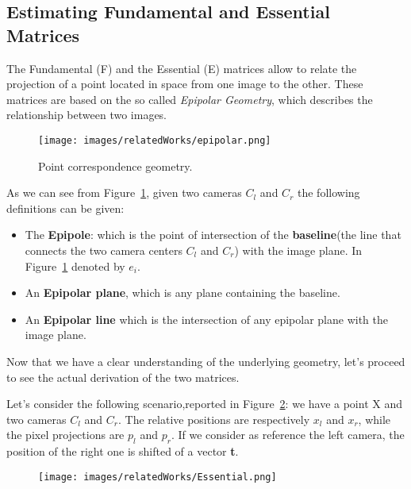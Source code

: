  \subsection{Estimating Fundamental and Essential Matrices}
The Fundamental (F) and the Essential (E) matrices allow to relate the projection of a point located in space from one image to the other.
These matrices are based on the so called \textit{Epipolar Geometry}, which describes the relationship between two images.
\begin{figure}
    \centering
    \texttt{[image: images/relatedWorks/epipolar.png]} %
    \caption{Point correspondence geometry. }
    \label{fig:epipolar}
\end{figure}
As we can see from Figure~\ref{fig:epipolar}, given two cameras $C_l$ and $C_r$ the following definitions can be given:
\begin{itemize}
    \item The \textbf{Epipole}: which is the point of intersection of the \textbf{baseline}(the line that connects the two camera centers
    $C_l$ and $C_r$) with the image plane. In Figure~\ref{fig:epipolar} denoted by $e_i$.
    \item An \textbf{Epipolar plane}, which is any plane containing the baseline.
    \item An \textbf{Epipolar line} which is the intersection of any epipolar plane with the image plane.

\end{itemize}
Now that we have a clear understanding of the underlying geometry, let's proceed to see the actual derivation of the
two matrices.

Let's consider the following scenario,reported in Figure~\ref{fig:EstimateMatrices}: we have a point X and two cameras $C_l$ and $C_r$. 
The relative positions are respectively $x_l$ and $x_r$, while the pixel projections are $p_l$ and $p_r$.
If we consider as reference the left camera, the position of the right one is shifted of a vector \textbf{t}.

\begin{figure}
    \centering
    \texttt{[image: images/relatedWorks/Essential.png]} %
    \caption{}
    \label{fig:EstimateMatrices}
\end{figure}

